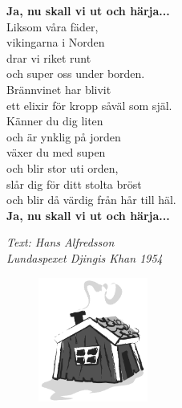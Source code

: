 \documentclass[a6paper,10pt]{article}
\begin{document}
\textbf{Ja, nu skall vi ut och härja...} 
\vspace{5pt}\\
Liksom våra fäder, \\
vikingarna i Norden\\
drar vi riket runt \\och super oss under borden.\\
Brännvinet har blivit \\ett elixir för kropp såväl som själ.
\vspace{5pt}\\
Känner du dig liten \\och är ynklig på jorden\\
växer du med supen \\och blir stor uti orden,\\
slår dig för ditt stolta bröst \\och blir då värdig från hår till häl. 
\vspace{5pt}\\
\textbf{Ja, nu skall vi ut och härja...} 
\begin{flushright}
   \textit{Text: Hans Alfredsson \\Lundaspexet Djingis Khan 1954}
\end{flushright}
\vspace{-30pt}
\begin{figure}[!h]
\includegraphics[width=0.32\textwidth]{rodstuga.png}
\end{figure}
\end{document}
